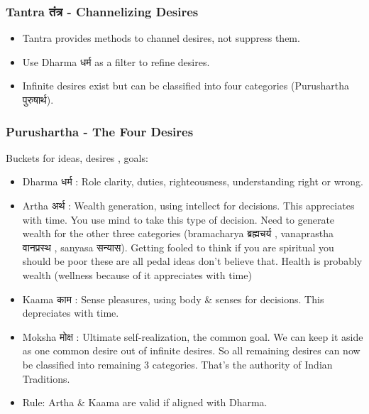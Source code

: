 \begin{frame}[fragile]\frametitle{Tantra तंत्र - Channelizing Desires}
      \begin{itemize}
        \item Tantra provides methods to channel desires, not suppress them.
        \item Use Dharma धर्म  as a filter to refine desires.
        \item Infinite desires exist but can be classified into four categories (Purushartha पुरुषार्थ).
      \end{itemize}
\end{frame}

\begin{frame}[fragile]\frametitle{Purushartha - The Four Desires}
Buckets for ideas, desires , goals:
      \begin{itemize}
        \item Dharma धर्म : Role clarity, duties, righteousness, understanding right or wrong.
        \item Artha अर्थ : Wealth generation, using intellect for decisions. This appreciates with time. You use mind to take this type of decision. Need to generate wealth
for the other three categories (bramacharya ब्रह्मचर्य , vanaprastha वानप्रस्थ , sanyasa सन्यास). Getting fooled to think if
you are spiritual you should be poor these are all pedal ideas don't believe that. Health is probably wealth (wellness because of it appreciates with time)
        \item Kaama काम : Sense pleasures, using body \& senses for decisions. This depreciates with time.
        \item Moksha मोक्ष : Ultimate self-realization, the common goal. We can keep it aside as one common desire out of infinite desires. So all remaining desires can now be classified into remaining 3 categories. That's the authority of Indian Traditions.
        \item Rule: Artha \& Kaama are valid if aligned with Dharma.
      \end{itemize}
\end{frame}

